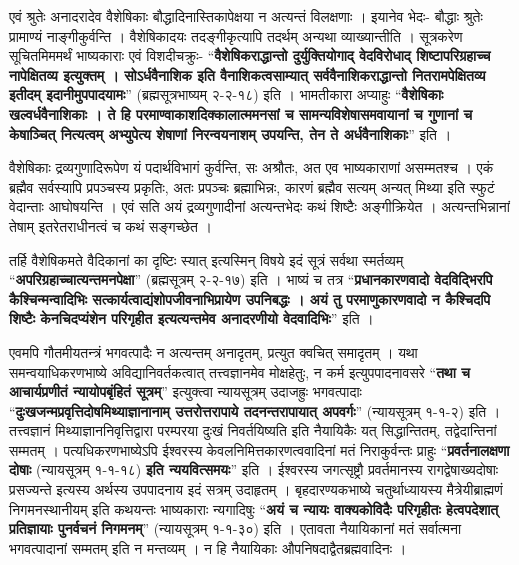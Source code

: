 {एवं श्रुतेः अनादरादेव वैशेषिकाः बौद्धादिनास्तिकापेक्षया न अत्यन्तं विलक्षणाः । इयानेव भेदः- बौद्धाः श्रुतेः प्रामाण्यं नाङ्गीकुर्वन्ति । वैशेषिकादयः तदङ्गीकृत्यापि तदर्थम् अन्यथा व्याख्यान्तीति । सूत्रकरेण सूचितमिममर्थं भाष्यकाराः एवं विशदीचक्रुः- “\textbf{वैशेषिकराद्धान्तो दुर्युक्तियोगाद् वेदविरोधाद् शिष्टापरिग्रहाच्च नापेक्षितव्य इत्युक्तम् । सोऽर्धवैनाशिक इति वैनाशिकत्वसाम्यात् सर्ववैनाशिकराद्धान्तो नितरामपेक्षितव्य इतीदम् इदानीमुपपादयामः}” (ब्रह्मसूत्रभाष्यम् २-२-१८) इति । भामतीकारा अप्याहुः “\textbf{वैशेषिकाः खल्वर्धवैनाशिकाः । ते हि परमाण्वाकाशदिक्कालात्ममनसां च सामन्यविशेषासमवायानां च गुणानां च केषाञ्चित् नित्यत्वम् अभ्युपेत्य शेषाणां निरन्वयनाशम् उपयन्ति, तेन ते अर्धवैनाशिकाः}” इति ।

वैशेषिकाः द्रव्यगुणादिरूपेण यं पदार्थविभागं कुर्वन्ति, सः अश्रौतः, अत एव भाष्यकाराणां असम्मतश्च । एकं ब्रह्मैव सर्वस्यापि प्रपञ्चस्य प्रकृतिः, अतः प्रपञ्चः ब्रह्माभिन्नः, कारणं ब्रह्मैव सत्यम् अन्यत् मिथ्या इति स्फुटं वेदान्ताः आघोषयन्ति । एवं सति अयं द्रव्यगुणादीनां अत्यन्तभेदः कथं शिष्टैः अङ्गीक्रियेत । अत्यन्तभिन्नानां तेषाम् इतरेतराधीनत्वं च कथं सङ्गच्छेत ।

तर्हि वैशेषिकमते वैदिकानां का दृष्टिः स्यात् इत्यस्मिन् विषये इदं सूत्रं सर्वथा स्मर्तव्यम् “\textbf{अपरिग्रहाच्चात्यन्तमनपेक्षा}” (ब्रह्मसूत्रम् २-२-१७) इति । भाष्यं च तत्र “\textbf{प्रधानकारणवादो वेदविद्भिरपि कैश्चिन्मन्वादिभिः सत्कार्यत्वाद्यंशोपजीवनाभिप्रायेण उपनिबद्धः । अयं तु परमाणुकारणवादो न कैश्चिदपि शिष्टैः केनचिदप्यंशेन परिगृहीत इत्यत्यन्तमेव अनादरणीयो वेदवादिभिः}” इति ।

एवमपि गौतमीयतन्त्रं भगवत्पादैः न अत्यन्तम् अनादृतम्, प्रत्युत क्वचित् समादृतम् । यथा समन्वयाधिकरणभाष्ये अविद्यानिवर्तकत्वात् तत्त्वज्ञानमेव मोक्षहेतुः, न कर्म इत्युपपादनावसरे “\textbf{तथा च आचार्यप्रणीतं न्यायोपबृंहितं सूत्रम्}” इत्युक्त्वा न्यायसूत्रम् उदाजह्रुः भगवत्पादाः “\textbf{दुःखजन्मप्रवृत्तिदोषमिथ्याज्ञानानाम् उत्तरोत्तरापाये तदनन्तरापायात् अपवर्गः}” (न्यायसूत्रम् १-१-२) इति । तत्त्वज्ञानं मिथ्याज्ञाननिवृत्तिद्वारा परम्परया दुःखं निवर्तयिष्यति इति नैयायिकैः यत् सिद्धान्तितम्, तद्वेदान्तिनां सम्मतम् । पत्यधिकरणभाष्येऽपि ईश्वरस्य केवलनिमित्तकारणत्ववादिनां मतं निराकुर्वन्तः प्राहुः “\textbf{प्रवर्तनालक्षणा दोषाः} (न्यायसूत्रम् १-१-१८) \textbf{इति न्ययवित्समयः}” इति । ईश्वरस्य जगत्सृष्ट्रौ प्रवर्तमानस्य रागद्वेषाख्यदोषाः प्रसज्यन्ते इत्यस्य अर्थस्य उपपादनाय इदं सत्रम् उदाहृतम् । बृहदारण्यकभाष्ये चतुर्थाध्यायस्य मैत्रेयीब्राह्मणं निगमनस्थानीयम् इति कथयन्तः भाष्यकाराः न्यगादिषुः “\textbf{अयं च न्यायः वाक्यकोविदैः परिगृहीतः हेत्वपदेशात् प्रतिज्ञायाः पुनर्वचनं निगमनम्}” (न्यायसूत्रम् १-१-३०) इति । एतावता नैयायिकानां मतं सर्वात्मना भगवत्पादानां सम्मतम् इति न मन्तव्यम् । न हि नैयायिकाः औपनिषदाद्वैतब्रह्मवादिनः ।

}
